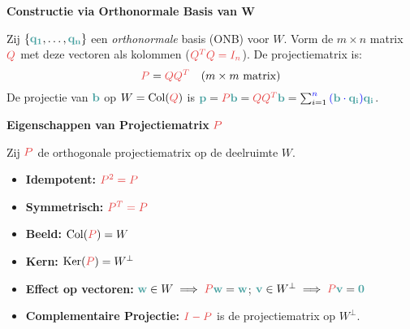 \documentclass[12pt]{article}
\renewcommand{\vec}[1]{\textcolor{vectorTeal}{\mathbf{#1}}}
\newcommand{\scalar}[1]{\textcolor{scalarBrightBlue}{#1}}
\newcommand{\mat}[1]{\textcolor{matrixSoftRed}{#1}}
\DeclareMathOperator{\Col}{Col}
\DeclareMathOperator{\Ker}{Ker}
\begin{document}
\vspace{1.5em} %
{\centering
\textcolor{headerBrown}{\large\textbf{Constructie via Orthonormale Basis van W}}
\par
}%
Zij $\{\vec{q_1}, \dots, \vec{q_n}\}$ een \textit{orthonormale} basis (ONB) voor $W$. Vorm de $m \times n$ matrix $\mat{Q}$ met deze vectoren als kolommen ($\mat{Q^T Q = I_n}$). De projectiematrix is:
\[
\mat{P} = \mat{Q Q^T} \quad (m \times m \text{ matrix})
\]
De projectie van $\vec{b}$ op $W = \Col(\mat{Q})$ is $\vec{p} = \mat{P}\vec{b} = \mat{Q Q^T} \vec{b} = \sum_{i=1}^{\scalar{n}} \scalar{(\vec{b} \cdot \vec{q_i})} \vec{q_i}$.

\vspace{1.5em} %
{\centering
\textcolor{headerBrown}{\large\textbf{Eigenschappen van Projectiematrix} $\mat{P}$}
\par
}%
Zij $\mat{P}$ de orthogonale projectiematrix op de deelruimte $W$.
\begin{itemize}
    \item \textbf{Idempotent:} $\mat{P^2 = P}$
    \item \textbf{Symmetrisch:} $\mat{P^T = P}$
    \item \textbf{Beeld:} $\Col(\mat{P}) = W$
    \item \textbf{Kern:} $\Ker(\mat{P}) = W^{\perp}$
    \item \textbf{Effect op vectoren:} $\vec{w} \in W \implies \mat{P}\vec{w} = \vec{w}$; \quad $\vec{v} \in W^{\perp} \implies \mat{P}\vec{v} = \vec{0}$
    \item \textbf{Complementaire Projectie:} $\mat{I - P}$ is de projectiematrix op $W^{\perp}$.
\end{itemize}
\end{document}
